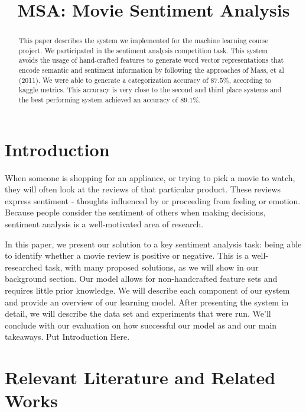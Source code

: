 \documentclass[11pt,letterpaper]{article}
\title{MSA: Movie Sentiment Analysis}
\begin{document}
\maketitle
\begin{abstract}
This paper describes the system we implemented for the machine learning course project. We participated in the sentiment analysis competition task. This system avoids the usage of hand-crafted features to generate word vector representations that encode semantic and sentiment information by following the approaches of Mass, et al (2011). We were able to generate a categorization accuracy of $87.5\%$, according to kaggle metrics. This accuracy is very close to the second and third place systems and the best performing system achieved an accuracy of $89.1\%$.
\end{abstract}

\section{Introduction}

When someone is shopping for an appliance, or trying to pick a movie to watch, they will often look at the reviews of that particular product. These reviews express sentiment - thoughts influenced by or proceeding from feeling or emotion. Because people consider the sentiment of others when making decisions, sentiment analysis is a well-motivated area of research.

In this paper, we present our solution to a key sentiment analysis task: being able to identify whether a movie review is positive or negative. This is a well-researched task, with many proposed solutions, as we will show in our background section. Our model allows for non-handcrafted feature sets and requires little prior knowledge. We will describe each component of our system and provide an overview of our learning model. After presenting the system in detail, we will describe the data set and experiments that were run. We’ll conclude with our evaluation on how successful our model as and our main takeaways.
Put Introduction Here.


\section{Relevant Literature and Related Works}
\end{document}
